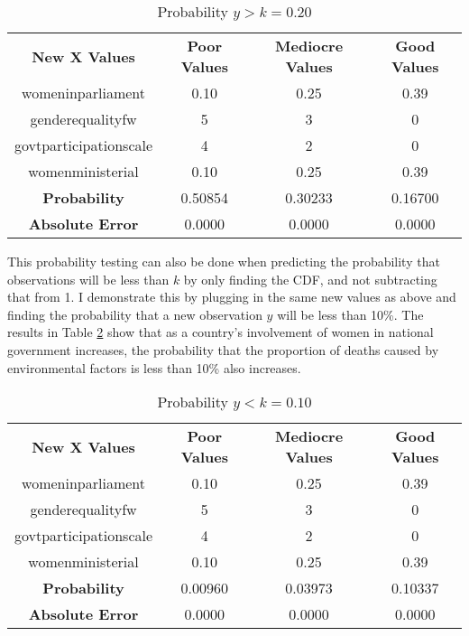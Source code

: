 \documentclass{svproc}
\begin{document}
\begin{table}[H]
\caption{Probability $y > k=0.20$}
\fontsize{10}{12}\selectfont
\begin{center}
\begin{tabular}{|c|c|c|c|}
\hline 
\textbf{ New X Values } & \textbf{ Poor Values } & \textbf{ Mediocre Values } & \textbf{ Good Values } \\
womeninparliament & { 0.10 } & { 0.25 } & { 0.39 }  \\
genderequalityfw &  5 & 3 & 0 \\
govtparticipationscale & 4 & 2 & 0 \\
womenministerial & 0.10 & 0.25 & 0.39 \\
\hline
\textbf{ Probability } & 0.50854 & 0.30233 & 0.16700 \\
\textbf{ Absolute Error } & 0.0000 & 0.0000 & 0.0000 \\
\hline
\end{tabular}
\label{tab:probgreater}
\end{center}
\end{table}

This probability testing can also be done when predicting the probability that observations will be less than $k$ by only finding the CDF, and not subtracting that from 1. I demonstrate this by plugging in the same new values as above and finding the probability that a new observation $y$ will be less than 10\%. The results in Table \ref{tab:probless} show that as a country's involvement of women in national government increases, the probability that the proportion of deaths caused by environmental factors is less than 10\% also increases.

\begin{table}[H]
\caption{Probability $y < k=0.10$}
\fontsize{10}{12}\selectfont
\begin{center}
\begin{tabular}{|c|c|c|c|}
\hline 
\textbf{ New X Values } & \textbf{ Poor Values } & \textbf{ Mediocre Values } & \textbf{ Good Values } \\
womeninparliament & { 0.10 } & { 0.25 } & { 0.39 }  \\
genderequalityfw &  5 & 3 & 0 \\
govtparticipationscale & 4 & 2 & 0 \\
womenministerial & 0.10 & 0.25 & 0.39 \\
\hline
\textbf{ Probability } & 0.00960 & 0.03973 & 0.10337 \\
\textbf{ Absolute Error } & 0.0000 & 0.0000 & 0.0000 \\
\hline
\end{tabular}
\label{tab:probless}
\end{center}
\end{table}
\end{document}
